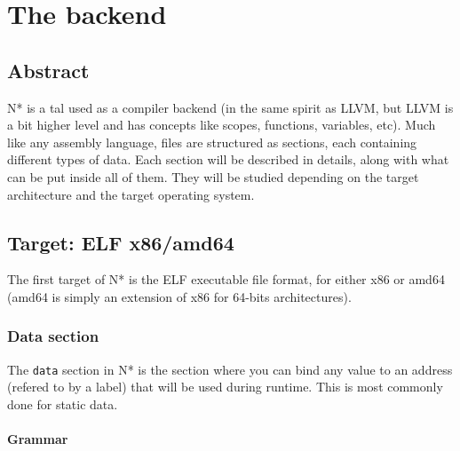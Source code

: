 \part{The backend}\label{part:nstar}


\chapter{Abstract}\label{chap:nstar-abstract}

N* is a \gls{tal} used as a compiler backend (in the same spirit as LLVM, but LLVM is a bit higher level and has concepts like scopes, functions, variables, etc).
Much like any assembly language, files are structured as sections, each containing different types of data.
Each section will be described in details, along with what can be put inside all of them.
They will be studied depending on the target architecture and the target operating system.

\chapter{Target: ELF x86/amd64}\label{chap:elfx86amd64}

The first target of N* is the ELF executable file format, for either x86 or amd64 (amd64 is simply an extension of x86 for 64-bits architectures).

\section{Data section}\label{sec:elf86amd64-data}

The \texttt{data} section in N* is the section where you can bind any value to an address (refered to by a label) that will be used during runtime.
This is most commonly done for static data.

\subsection{Grammar}\label{subsec:elf86amd64-data-grammar}

\begin{figure}[h]
  \centering
\end{figure}
